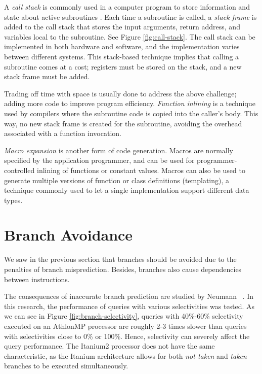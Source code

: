 A \textit{call stack} is commonly used in a computer program to store information and state about active subroutines \cite{Wikipedia_contributors2015-od}. Each time a subroutine is called, a \textit{stack frame} is added to the call stack that stores the input arguments, return address, and variables local to the subroutine. See Figure \ref{fig:call-stack}. The call stack can be implemented in both hardware and software, and the implementation varies between different systems. This stack-based technique implies that calling a subroutine comes at a cost; registers must be stored on the stack, and a new stack frame must be added.

Trading off time with space is usually done to address the above challenge; adding more code to improve program efficiency. \textit{Function inlining} is a technique used by compilers where the subroutine code is copied into the caller's body. This way, no new stack frame is created for the subroutine, avoiding the overhead associated with a function invocation.

\textit{Macro expansion} is another form of code generation. Macros are normally specified by the application programmer, and can be used for programmer-controlled inlining of functions or constant values. Macros can also be used to generate multiple versions of function or class definitions (templating), a technique commonly used to let a single implementation support different data types.

\section{Branch Avoidance}
\label{sec:Branch Avoidance}

We saw in the previous section that branches should be avoided due to the penalties of branch misprediction. Besides, branches also cause dependencies between instructions. 

The consequences of inaccurate branch prediction are studied by Neumann \ea~\cite{Neumann2011-uq}. In this research, the performance of queries with various selectivities was tested. As we can see in Figure \ref{fig:branch-selectivity}, queries with 40\%-60\% selectivity executed on an AthlonMP processor are roughly 2-3 times slower than queries with selectivities close to 0\% or 100\%. Hence, selectivity can severely affect the query performance. The Itanium2 processor does not have the same characteristic, as the Itanium architecture allows for both \textit{not taken} and \textit{taken} branches to be executed simultaneously.

